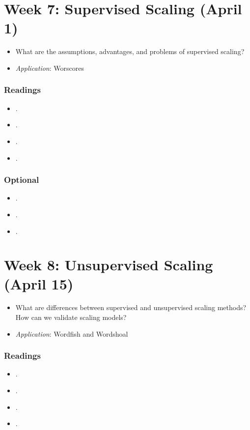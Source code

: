 \documentclass[abstract=on,parskip=full,headings=standardclasses,fontsize=11pt,paper=a4]{scrartcl}
\begin{document}
 
\section{Week 7:  Supervised Scaling (April 1)}

\begin{itemize}
\renewcommand\labelitemi{--}
\item What are the assumptions, advantages, and problems of supervised scaling?
\item \textit{Application}: Worscores
\end{itemize}

\subsubsection*{Readings}
\begin{itemize}
\item {}.
\item {}.
\item {}.
\item {}.
\end{itemize}

\subsubsection*{Optional}
\begin{itemize}
\item {}.
\item {}.
\item {}.
\end{itemize}


\section{Week 8: Unsupervised Scaling (April 15)}

\begin{itemize}
\renewcommand\labelitemi{--}
\item What are differences between supervised and unsupervised scaling methods? How can we validate scaling models?
\item \textit{Application}: Wordfish and Wordshoal
\end{itemize}

\subsubsection*{Readings}
\begin{itemize}
\item {}.
\item {}.
\item {}.
\item {}.
\end{itemize}
\end{document}
